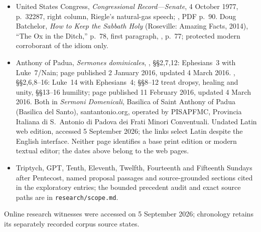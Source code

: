{\begin{itemize}[leftmargin=1.1em,itemsep=0.3em,parsep=0pt]
\item United States Congress, \textit{Congressional Record---Senate}, 4 October 1977, p.~32287, right column, Riegle's natural-gas speech; , PDF p.~90. Doug Batchelor, \textit{How to Keep the Sabbath Holy} (Roseville: Amazing Facts, 2014), ``The Ox in the Ditch,'' p.~78, first paragraph, , p.~77; protected modern corroborant of the idiom only.
\item Anthony of Padua, \textit{Sermones dominicales}, , §§2,7,12: Ephesians~3 with Luke~7/Nain; page published 2 January 2016, updated 4 March 2016. , §§2,6,8--16: Luke~14 with Ephesians~4; §§8--12 treat dropsy, healing and unity, §§13--16 humility; page published 11 February 2016, updated 4 March 2016. Both in \textit{Sermoni Domenicali}, Basilica of Saint Anthony of Padua (Basilica del Santo), santantonio.org, operated by PISAPFMC, Provincia Italiana di S.~Antonio di Padova dei Frati Minori Conventuali. Undated Latin web edition, accessed 5 September 2026; the links select Latin despite the English interface. Neither page identifies a base print edition or modern textual editor; the dates above belong to the web pages.
\item Triptych, GPT, Tenth, Eleventh, Twelfth, Fourteenth and Fifteenth Sundays after Pentecost, named proposal passages and source-grounded sections cited in the exploratory entries; the bounded precedent audit and exact source paths are in \texttt{research/scope.md}.
\end{itemize}
Online research witnesses were accessed on 5 September 2026; chronology retains its separately recorded corpus source states.
}
